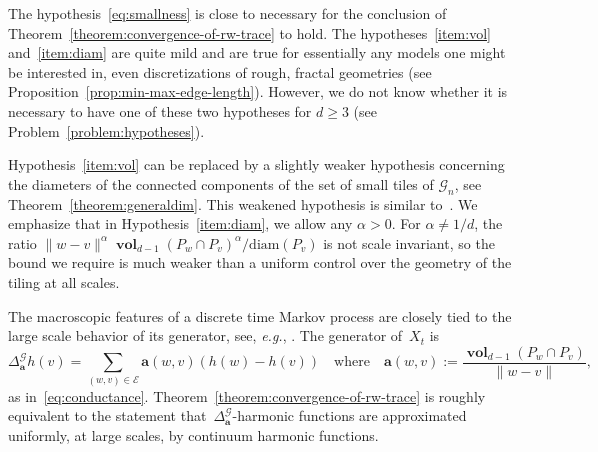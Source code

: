 \documentclass[12pt]{amsart}
\numberwithin{equation}{section}
\newcommand{\eg}{{\it e.g.}}
\newcommand{\G}{\mathcal{G}}
\newcommand{\E}{\mathcal{E}}
\newcommand{\aDelta}{\hyperref[eq:geometric-laplacian]{{\Delta^{\mathcal{G}}_{\cond}}}}
\newcommand{\cond}{\hyperref[eq:geometric-laplacian]{\mathbf{a}}}
\DeclareMathOperator{\vol}{\mathbf{vol}}
\begin{document}
The hypothesis~\eqref{eq:smallness} is close to necessary for the conclusion of Theorem~\ref{theorem:convergence-of-rw-trace} to hold. 
The hypotheses~\ref{item:vol} and~\ref{item:diam} are quite mild and are true for essentially any models one might be interested in, even discretizations of rough, fractal geometries (see Proposition~\ref{prop:min-max-edge-length}). However, we do not know whether it is necessary to have one of these two hypotheses for $d\geq 3$ (see Problem~\ref{problem:hypotheses}).

Hypothesis~\ref{item:vol} can be replaced by a slightly weaker hypothesis concerning the diameters of the connected components of the set of small tiles of $\G_n$, see Theorem~\ref{theorem:generaldim}. This weakened hypothesis is similar to~\cite[Assumption 1.2]{CLM}. We emphasize that in Hypothesis~\ref{item:diam}, we allow any $\alpha > 0$. For $\alpha \not=1/d$, the ratio $\|w-v\|^{\alpha} \vol_{d-1}(P_w \cap P_v)^{\alpha} / \mathrm{diam}(P_v)$ is not scale invariant, so the bound we require is much weaker than a uniform control over the geometry of the tiling at all scales. 
 \smallskip

The macroscopic features of a discrete time Markov process are closely tied to the large scale behavior of its generator, see, \eg, \cite[Theorem 19.25]{MR4226142}. The generator of~$X_t$ is
\begin{equation}
	\label{eq:geometric-laplacian}
	\aDelta h(v) = \sum_{(w,v) \in \E}  \cond(w,v)( h(w) - h(v))
	\quad \mbox{where}  \quad 	\cond(w,v) :=  \frac{\vol_{d-1}(P_w \cap P_v)}{\|w - v\| } , \, 
\end{equation}
as in~\eqref{eq:conductance}.
Theorem~\ref{theorem:convergence-of-rw-trace} is roughly equivalent to the statement that~$\aDelta$-harmonic functions are approximated uniformly, at large scales, by continuum harmonic functions. 
\end{document}
